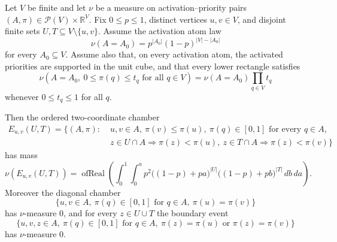 \begin{helper}
Let \(V\) be finite and let \(\nu\) be a measure on activation--priority
pairs \((A,\pi)\in \mathcal P(V)\times \mathbb R^V\).  Fix \(0\le p\le1\),
distinct vertices \(u,v\in V\), and disjoint finite sets
\(U,T\subseteq V\setminus\{u,v\}\).  Assume the activation atom law
\[
\nu(A=A_0)=p^{|A_0|}(1-p)^{|V|-|A_0|}
\]
for every \(A_0\subseteq V\).  Assume also that, on every activation atom,
the activated priorities are supported in the unit cube, and that every lower
rectangle satisfies
\[
\nu(A=A_0,\ 0\le \pi(q)\le t_q\text{ for all }q\in V)
=\nu(A=A_0)\prod_{q\in V}t_q
\]
whenever \(0\le t_q\le1\) for all \(q\).

Then the ordered two-coordinate chamber
\[
\begin{aligned}
E_{u,v}(U,T)=\{(A,\pi):\;&u,v\in A,\ \pi(v)\le \pi(u),\
\pi(q)\in[0,1]\text{ for every }q\in A,\\
& z\in U\cap A\Rightarrow \pi(z)<\pi(u),\
z\in T\cap A\Rightarrow \pi(z)<\pi(v)\}
\end{aligned}
\]
has mass
\[
\nu(E_{u,v}(U,T))
=\operatorname{ofReal}\!\left(
\int_0^1\int_0^a
p^2\bigl((1-p)+pa\bigr)^{|U|}
\bigl((1-p)+pb\bigr)^{|T|}\,db\,da\right).
\]
Moreover the diagonal chamber
\[
\{u,v\in A,\ \pi(q)\in[0,1]\text{ for }q\in A,\ \pi(u)=\pi(v)\}
\]
has \(\nu\)-measure \(0\), and for every \(z\in U\cup T\) the boundary event
\[
\{u,v,z\in A,\ \pi(q)\in[0,1]\text{ for }q\in A,\ 
\pi(z)=\pi(u)\text{ or }\pi(z)=\pi(v)\}
\]
has \(\nu\)-measure \(0\).
\end{helper}
